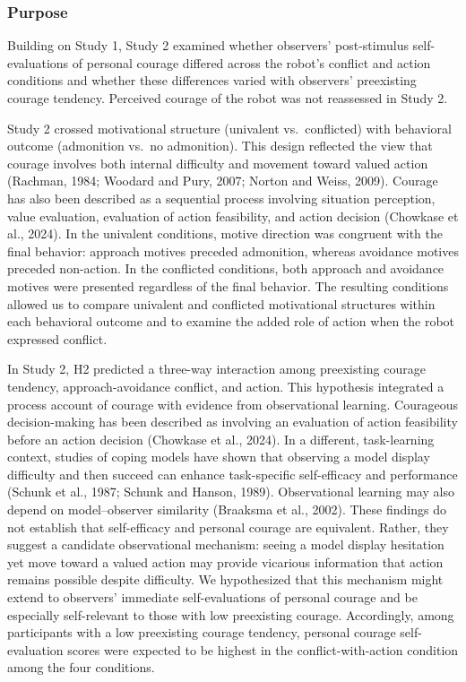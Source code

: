 \subsubsection{Purpose}\label{purpose-1}

Building on Study 1, Study 2 examined whether observers' post-stimulus
self-evaluations of personal courage differed across the robot's
conflict and action conditions and whether these differences varied with
observers' preexisting courage tendency. Perceived courage of the robot
was not reassessed in Study 2.

Study 2 crossed motivational structure (univalent vs.~conflicted) with
behavioral outcome (admonition vs.~no admonition). This design reflected
the view that courage involves both internal difficulty and movement
toward valued action (Rachman, 1984; Woodard and Pury, 2007; Norton and
Weiss, 2009). Courage has also been described as a sequential process
involving situation perception, value evaluation, evaluation of action
feasibility, and action decision (Chowkase et al., 2024). In the
univalent conditions, motive direction was congruent with the final
behavior: approach motives preceded admonition, whereas avoidance
motives preceded non-action. In the conflicted conditions, both approach
and avoidance motives were presented regardless of the final behavior.
The resulting conditions allowed us to compare univalent and conflicted
motivational structures within each behavioral outcome and to examine
the added role of action when the robot expressed conflict.

In Study 2, H2 predicted a three-way interaction among preexisting
courage tendency, approach-avoidance conflict, and action. This
hypothesis integrated a process account of courage with evidence from
observational learning. Courageous decision-making has been described as
involving an evaluation of action feasibility before an action decision
(Chowkase et al., 2024). In a different, task-learning context, studies
of coping models have shown that observing a model display difficulty
and then succeed can enhance task-specific self-efficacy and performance
(Schunk et al., 1987; Schunk and Hanson, 1989). Observational learning
may also depend on model--observer similarity (Braaksma et al., 2002).
These findings do not establish that self-efficacy and personal courage
are equivalent. Rather, they suggest a candidate observational
mechanism: seeing a model display hesitation yet move toward a valued
action may provide vicarious information that action remains possible
despite difficulty. We hypothesized that this mechanism might extend to
observers' immediate self-evaluations of personal courage and be
especially self-relevant to those with low preexisting courage.
Accordingly, among participants with a low preexisting courage tendency,
personal courage self-evaluation scores were expected to be highest in
the conflict-with-action condition among the four conditions.

